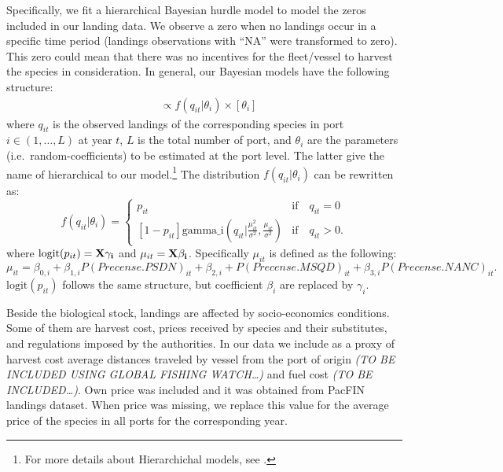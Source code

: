 \documentclass[
]{article}
\begin{document}
Specifically, we fit a hierarchical Bayesian hurdle model to model the
zeros included in our landing data. We observe a zero when no landings
occur in a specific time period (landings observations with ``NA'' were
transformed to zero). This zero could mean that there was no incentives
for the fleet/vessel to harvest the species in consideration. In
general, our Bayesian models have the following structure:
\begin{align*}
[\theta_i | q_{it}] &  \varpropto f\left(q_{it} | \theta_i\right) \times [\theta_i] 
\end{align*} where \(q_{it}\) is the observed landings of the
corresponding species in port \(i \in (1,\ldots,L)\) at year \(t\),
\(L\) is the total number of port, and \(\theta_i\) are the parameters
(i.e.~random-coefficients) to be estimated at the port level. The latter
give the name of hierarchical to our model.\footnote{For more details
  about Hierarchichal models, see \cite{hobbs2015}.} The distribution
\(f\left(q_{it} | \theta_i\right)\) can be rewritten as:
\begin{equation}
f\left(q_{it} | \theta_i \right) = \begin{cases}
p_{it} & \text{if} \quad q_{it} = 0  \\ 
\left[1-p_{it}\right] \text{gamma_i} \left(q_{it} | \frac{\mu_{it}^2}{\sigma^2}, \frac{\mu_{it}}{\sigma^2} \right) & \text{if} \quad q_{it} > 0. 
\end{cases}
\end{equation} where \(\text{logit}(p_{it}) = \bf{X}\gamma_i\) and
\(\mu_{it} = \bf{X}\beta_i\). Specifically \(\mu_{it}\) is defined as
the following: \begin{equation}
\mu_{it} = \beta_{0,i} + \beta_{1,i} P(Precense.PSDN)_{it} + \beta_{2,i} + P(Precense.MSQD)_{it} + \beta_{3,i} P(Precense.NANC)_{it}.
\end{equation} \(\text{logit}(p_{it})\) follows the same structure, but
coefficient \(\beta_i\) are replaced by \(\gamma_i\).

Beside the biological stock, landings are affected by socio-economics
conditions. Some of them are harvest cost, prices received by species
and their substitutes, and regulations imposed by the authorities. In
our data we include as a proxy of harvest cost average distances
traveled by vessel from the port of origin \emph{(TO BE INCLUDED USING
GLOBAL FISHING WATCH\ldots)} and fuel cost \emph{(TO BE
INCLUDED\ldots)}. Own price was included and it was obtained from PacFIN
landings dataset. When price was missing, we replace this value for the
average price of the species in all ports for the corresponding year.
\end{document}
